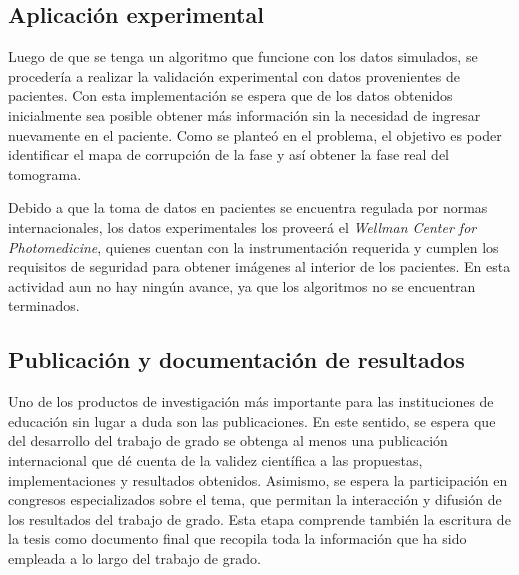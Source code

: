 \subsection{Aplicación experimental}

Luego de que se tenga un algoritmo que funcione con los datos simulados, se procedería a realizar la validación experimental con datos provenientes de pacientes. Con esta implementación se espera que de los datos obtenidos inicialmente sea posible obtener más información sin la necesidad de ingresar nuevamente en el paciente. Como se planteó en el problema, el objetivo es poder identificar el mapa de corrupción de la fase y así obtener la fase real del tomograma. 

Debido a que la toma de datos en pacientes se encuentra regulada por normas internacionales, los datos experimentales los proveerá el \emph{Wellman Center for Photomedicine}, quienes cuentan con la instrumentación requerida y cumplen los requisitos de seguridad para obtener imágenes al interior de los pacientes. En esta actividad aun no hay ningún avance, ya que los algoritmos no se encuentran terminados.

\subsection{Publicación y documentación de resultados}

Uno de los productos de investigación más importante para las instituciones de educación sin lugar a duda son las publicaciones. En este sentido, se espera que del desarrollo del trabajo de grado se obtenga al menos una publicación internacional que dé cuenta de la validez científica a las propuestas, implementaciones y resultados obtenidos. Asimismo, se espera la participación en congresos especializados sobre el tema, que permitan la interacción y difusión de los resultados del trabajo de grado. Esta etapa comprende también la escritura de la tesis como documento final que recopila toda la información que ha sido empleada a lo largo del trabajo de grado. 